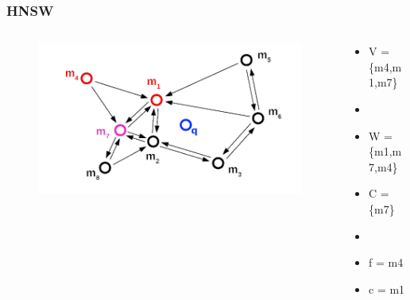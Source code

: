\documentclass{beamer}
\begin{document}
	\begin{frame}
		\frametitle{HNSW}
		\begin{columns}[T] %
			\begin{column}{.6\textwidth}
				\begin{figure}
					\includegraphics[scale=0.3]{figures/HNSW_b5.png}
				\end{figure}
			\end{column}%
			\hfill%
			\begin{column}{.4\textwidth}
				\begin{itemize}
					\item V = \{m4,m1,m7\}
					\item[]
					\item W = \{m1,m7,m4\}
					\item C = \{m7\}
					\item[]
					\item f = m4
					\item c = m1
				\end{itemize}
			\end{column}%
		\end{columns}
	\end{frame}
\end{document}
